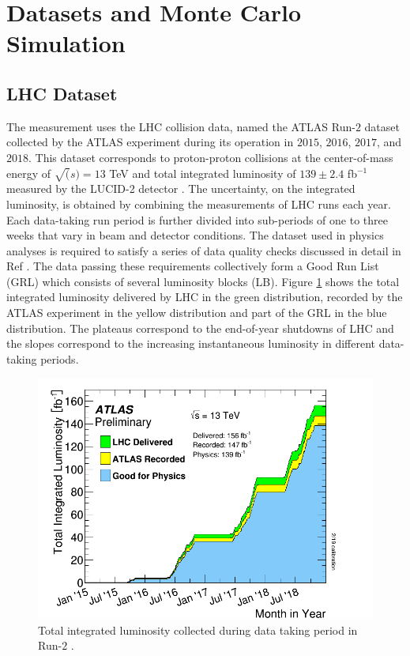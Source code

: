 \section{Datasets and Monte Carlo Simulation}
\label{sec:DataSetAndMonteCarlo}

\subsection{LHC Dataset}
\label{subsec:Dataset}

The measurement uses the LHC collision data, named the ATLAS Run-$2$ dataset collected by the ATLAS experiment during its operation in $2015$, $2016$, $2017$, and $2018$. This dataset corresponds to proton-proton collisions at the center-of-mass energy of $\sqrt(s) = 13$ TeV and total integrated luminosity of $139 \pm 2.4$ fb$^{-1}$ measured by the LUCID-2 detector \cite{ATLASLuminosityDetector}\cite{ATLASRun2IntegratedLumi}. The uncertainty, on the integrated luminosity, is obtained by combining the measurements of LHC runs each year. Each data-taking run period is further divided into sub-periods of one to three weeks that vary in beam and detector conditions. The dataset used in physics analyses is required to satisfy a series of data quality checks discussed in detail in Ref \cite{ATLASRun2DataTaking}. The data passing these requirements collectively form a Good Run List (GRL) which consists of several luminosity blocks (LB). Figure \ref{fig:InstLuminosity} shows the total integrated luminosity delivered by LHC in the green distribution, recorded by the ATLAS experiment in the yellow distribution and part of the GRL in the blue distribution. The plateaus correspond to the end-of-year shutdowns of LHC and the slopes correspond to the increasing instantaneous luminosity in different data-taking periods. 

\begin{figure}
\centering
\includegraphics[width=.8\linewidth]{figures/AnalysisOverview/IntegratedLumiRun2.pdf}  
  \caption{Total integrated luminosity collected during data taking period in Run-$2$ \cite{ATLASRun2DataTaking}. }
\label{fig:InstLuminosity}
\end{figure}

